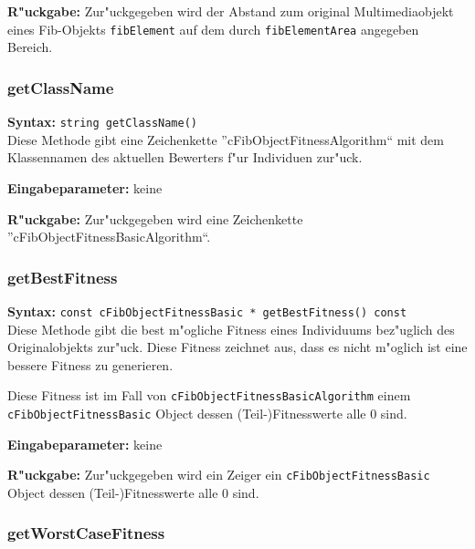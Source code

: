 \bigskip\noindent
\textbf{R"uckgabe:} Zur"uckgegeben wird der Abstand zum original Multimediaobjekt eines Fib-Objekts \verb|fibElement| auf dem durch \verb|fibElementArea| angegeben Bereich.


\subsubsection{getClassName}

\textbf{Syntax:} \verb|string getClassName()| \\

Diese Methode gibt eine Zeichenkette ''cFibObjectFitnessAlgorithm`` mit dem Klassennamen des aktuellen Bewerters f"ur Individuen zur"uck.

\bigskip\noindent
\textbf{Eingabeparameter:} keine

\bigskip\noindent
\textbf{R"uckgabe:} Zur"uckgegeben wird eine Zeichenkette ''cFibObjectFitnessBasicAlgorithm``.


\subsubsection{getBestFitness}

\textbf{Syntax:} \verb|const cFibObjectFitnessBasic * getBestFitness() const| \\

Diese Methode gibt die best m"ogliche Fitness eines Individuums bez"uglich des Originalobjekts zur"uck. Diese Fitness zeichnet aus, dass es nicht m"oglich ist eine bessere Fitness zu generieren.

Diese Fitness ist im Fall von \verb|cFibObjectFitnessBasicAlgorithm| einem \verb|cFibObjectFitnessBasic| Object dessen (Teil-)Fitnesswerte alle $0$ sind.

\bigskip\noindent
\textbf{Eingabeparameter:} keine

\bigskip\noindent
\textbf{R"uckgabe:} Zur"uckgegeben wird ein Zeiger ein \verb|cFibObjectFitnessBasic| Object dessen (Teil-)Fitnesswerte alle $0$ sind.


\subsubsection{getWorstCaseFitness}

